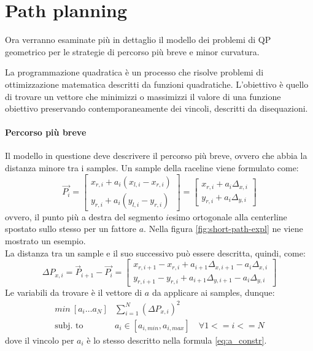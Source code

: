 \section{Path planning}
\label{sec:path-models}
Ora verranno esaminate più in dettaglio il modello dei problemi di QP
geometrico per le strategie di percorso più breve e minor curvatura.

La programmazione quadratica è un processo che risolve problemi di ottimizzazione matematica descritti da
funzioni quadratiche. L'obiettivo è quello di trovare un vettore che minimizzi o massimizzi il valore di
una funzione obiettivo preservando contemporaneamente dei vincoli, descritti da disequazioni.

\paragraph{Percorso più breve}\cite{race-model}\cite{globalplanning-lec}
Il modello in questione deve descrivere il percorso più breve, ovvero che abbia la distanza minore tra i
samples. Un sample della raceline viene formulato come:
\[
	\overrightarrow{P_i} =
	\begin{bmatrix}
		x_{r,i} + a_i(x_{l,i} - x_{r,i}) \\
		y_{r,i} + a_i(y_{l,i} - y_{r,i})
	\end{bmatrix} =
	\begin{bmatrix}
		x_{r,i} + a_i\Delta_{x,i} \\
		y_{r,i} + a_i\Delta_{y,i}
	\end{bmatrix}
\]
ovvero, il punto più a destra del segmento $i$esimo ortogonale alla centerline spostato sullo stesso per
un fattore $a$. Nella figura \ref{fig:short-path-expl} ne viene mostrato un esempio.\\
La distanza tra un sample e il suo successivo può essere descritta, quindi, come:
\[
	\Delta P_{x, i} = \overrightarrow{P}_{i+1} - \overrightarrow{P_i} = \begin{bmatrix}
		x_{r,i+1} - x_{r,i} + a_{i+1}\Delta_{x,i+1} - a_i\Delta_{x, i} \\
		y_{r,i+1} - y_{r,i} + a_{i+1}\Delta_{y,i+1} - a_i\Delta_{y, i}
	\end{bmatrix}
\]
Le variabili da trovare è il vettore di $a$ da applicare ai samples, dunque:
\[
	\begin{aligned}
		min\ [a_i \dots a_N] & \sum_{i=1}^{N} (\Delta P_{x,i})^2                          \\
		\text{subj. to}\     & a_i \in [a_{i, min}, a_{i, max}] \quad \forall 1 <= i <= N
	\end{aligned}
\]
dove il vincolo per $a_i$ è lo stesso descritto nella formula \ref{eq:a_constr}.

